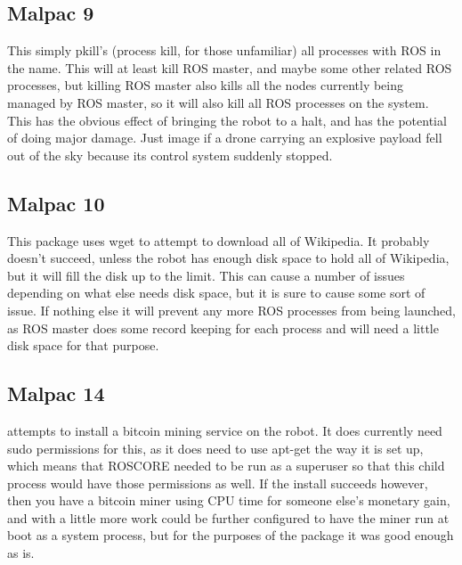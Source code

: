 \documentclass[IEEEtran,letterpaper,10pt,notitlepage,draftclsnofoot,onecolumn]{article}
\begin{document}
\subsection{Malpac 9}
This simply pkill’s (process kill, for those unfamiliar) all processes with ROS in the name. 
This will at least kill ROS master, and maybe some other related ROS processes, but killing ROS master also kills all the nodes currently being managed by ROS master, so it will also kill all ROS processes on the system. 
This has the obvious effect of bringing the robot to a halt, and has the potential of doing major damage. 
Just image if a drone carrying an explosive payload fell out of the sky because its control system suddenly stopped.

\subsection{Malpac 10} 
This package uses wget to attempt to download all of Wikipedia. 
It probably doesn’t succeed, unless the robot has enough disk space to hold all of Wikipedia, but it will fill the disk up to the limit.
This can cause a number of issues depending on what else needs disk space, but it is sure to cause some sort of issue. 
If nothing else it will prevent any more ROS processes from being launched, as ROS master does some record keeping for each process and will need a little disk space for that purpose. 

\subsection{Malpac 14} 
attempts to install a bitcoin mining service on the robot. 
It does currently need sudo permissions for this, as it does need to use apt-get the way it is set up, which means that ROSCORE needed to be run as a superuser so that this child process would have those permissions as well. 
If the install succeeds however, then you have a bitcoin miner using CPU time for someone else’s monetary gain, and with a little more work could be further configured to have the miner run at boot as a system process, but for the purposes of the package it was good enough as is. 
\end{document}

